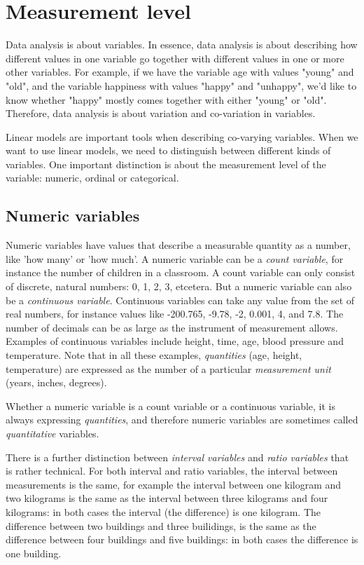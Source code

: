 \documentclass[]{report}\usepackage[]{graphicx}\usepackage[]{color}
\begin{document}
\section{Measurement level}


Data analysis is about variables. In essence, data analysis is about describing how different values in one variable go together with different values in one or more other variables. For example, if we have the variable age with values "young" and "old", and the variable happiness with values "happy" and "unhappy", we'd like to know whether "happy" mostly comes together with either "young" or "old". Therefore, data analysis is about variation and co-variation in variables.

Linear models are important tools when describing co-varying variables. When we want to use linear models, we need to distinguish between different kinds of variables. One important distinction is about the measurement level of the variable: numeric, ordinal or categorical.


\subsection{Numeric variables}

Numeric variables have values that describe a measurable quantity as a number, like 'how many' or 'how much'. A numeric variable can be a \textit{count variable}, for instance the number of children in a classroom. A count variable can only consist of discrete, natural numbers: 0, 1, 2, 3, etcetera. But a numeric variable can also be a \textit{continuous variable}. Continuous variables can take any value from the set of real numbers, for instance values like -200.765, -9.78, -2, 0.001, 4, and 7.8. The number of decimals can be as large as the instrument of measurement allows. Examples of continuous variables include height, time, age, blood pressure and temperature. Note that in all these examples, \textit{quantities} (age, height, temperature) are expressed as the number of a particular \textit{measurement unit} (years, inches, degrees).

Whether a numeric variable is a count variable or a continuous variable, it is always expressing \textit{quantities}, and therefore numeric variables are sometimes called \textit{quantitative} variables.

There is a further distinction between \textit{interval variables} and \textit{ratio variables} that is rather technical. For both interval and ratio variables, the interval between measurements is the same, for example the interval between one kilogram and two kilograms is the same as the interval between three kilograms and four kilograms: in both cases the interval (the difference) is one kilogram. The difference between two buildings and three builidings, is the same as the difference between four buildings and five buildings: in both cases the difference is one building.
\end{document}
